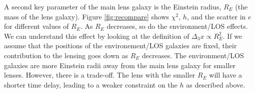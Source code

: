 A second key parameter of the main lens galaxy is the Einstein radius, $R_E$ (the mass of the lens galaxy). Figure \ref{fig:recompare} shows $\chi^2$, $h$, and the scatter in $e$ for different values of $R_E$. As $R_E$ decreases, so do the environment/LOS effects. We can understand this effect by looking at the definition of $\Delta_3 x \propto R_E^2$. If we assume that the positions of the environement/LOS galaxies are fixed, their contribution to the lensing goes down as $R_E$ decreases. The environment/LOS galaxies are more Einstein radii away from the main lens galaxy for smaller lenses. However, there is a trade-off. The lens with the smaller $R_E$ will have a shorter time delay, leading to a weaker constraint on the $h$ as described above.
  